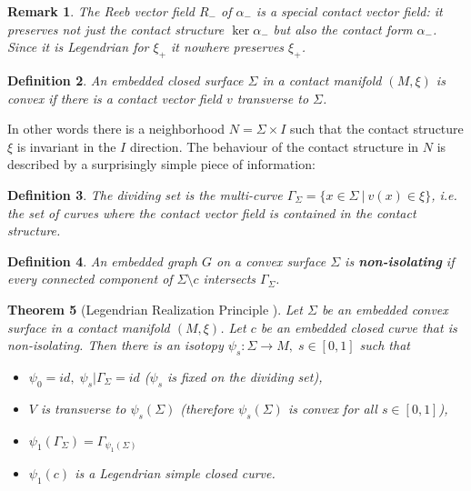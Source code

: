 \documentclass{amsart}
\newtheorem{theorem}{Theorem}[section]
\newtheorem{definition}[theorem]{Definition}
\newtheorem{remark}[theorem]{Remark}
\theoremstyle{definition}
\theoremstyle{remark}
\begin{document}
\begin{remark}
    The Reeb vector field $R_-$ of $\alpha_-$   is a special contact vector field: it preserves not just the contact structure $\ker \alpha_-$ but also the contact form $\alpha_-$. Since it is Legendrian for $\xi_+$ it nowhere preserves $\xi_+$.
\end{remark}

\begin{definition}
    An embedded closed surface $\Sigma$ in a contact manifold $(M,\xi)$ is convex \cite{Gir01} if there is a contact vector field $v$ transverse to $\Sigma$.
\end{definition}
In other words there is a neighborhood $N=\Sigma\times I$ such that the contact structure $\xi$ is invariant in the $I$ direction. The behaviour of the contact structure in $N$ is described by a surprisingly simple piece of information: 

\begin{definition}
The dividing set is the multi-curve  $\Gamma_\Sigma=\{x\in \Sigma \:|\:v(x)\in \xi\} $, i.e. the set of curves where the contact vector field is contained in the contact structure. 
\end{definition}

\begin{definition} 
\label{defn:non isolating curve}
An embedded graph $G$ on a convex surface $\Sigma$ is \textbf{non-isolating} if every connected component of $\Sigma\setminus c$ intersects $\Gamma_{\Sigma}$.
    

\end{definition}



\begin{theorem}[Legendrian Realization Principle \cite{Et04}]
\label{LRP}
Let $\Sigma$ be an embedded convex surface in a contact manifold $(M,\xi)$. Let $c$ be an embedded closed curve that is non-isolating. Then there is an isotopy $\psi_s \colon \Sigma \rightarrow M,\; s\in [0,1]$ such that
\begin{itemize}
    \item $\psi_0=id,\; \psi_s|\Gamma_{\Sigma}=id$ ($\psi_s$ is fixed on the dividing set),
    \item $V$ is transverse to $\psi_s(\Sigma)$ (therefore $\psi_s(\Sigma)$ is convex for all $s\in [0,1]$),
    \item $\psi_1(\Gamma_{\Sigma})=\Gamma_{\psi_1(\Sigma)}$
    \item $\psi_1(c)$\; is\; a Legendrian simple closed curve.

\end{itemize}
\end{theorem}
\end{document}
